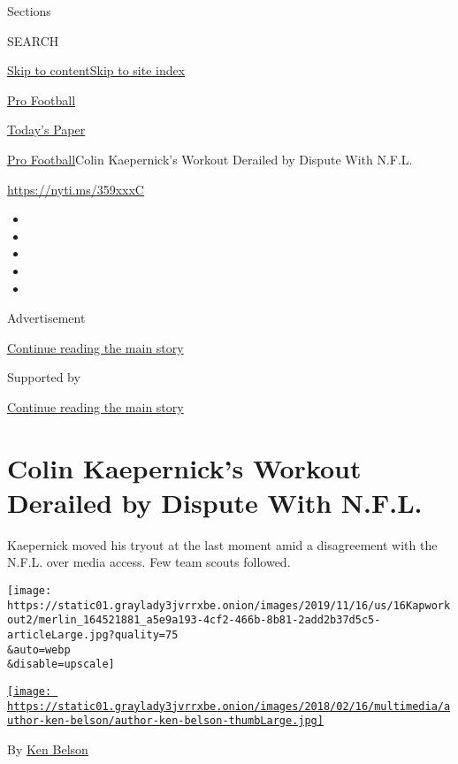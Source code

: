 Sections

SEARCH

\protect\hyperlink{site-content}{Skip to
content}\protect\hyperlink{site-index}{Skip to site index}

\href{https://www.nytimes3xbfgragh.onion/section/sports/football}{Pro
Football}

\href{https://myaccount.nytimes3xbfgragh.onion/auth/login?response_type=cookie\&client_id=vi}{}

\href{https://www.nytimes3xbfgragh.onion/section/todayspaper}{Today's
Paper}

\href{/section/sports/football}{Pro Football}\textbar{}Colin
Kaepernick's Workout Derailed by Dispute With N.F.L.

\url{https://nyti.ms/359xxxC}

\begin{itemize}
\item
\item
\item
\item
\item
\end{itemize}

Advertisement

\protect\hyperlink{after-top}{Continue reading the main story}

Supported by

\protect\hyperlink{after-sponsor}{Continue reading the main story}

\hypertarget{colin-kaepernicks-workout-derailed-by-dispute-with-nfl}{%
\section{Colin Kaepernick's Workout Derailed by Dispute With
N.F.L.}\label{colin-kaepernicks-workout-derailed-by-dispute-with-nfl}}

Kaepernick moved his tryout at the last moment amid a disagreement with
the N.F.L. over media access. Few team scouts followed.

\texttt{[image: https://static01.graylady3jvrrxbe.onion/images/2019/11/16/us/16Kapworkout2/merlin\_164521881\_a5e9a193-4cf2-466b-8b81-2add2b37d5c5-articleLarge.jpg?quality=75\\\&auto=webp\\\&disable=upscale]}

\href{https://www.nytimes3xbfgragh.onion/by/ken-belson}{\texttt{[image: https://static01.graylady3jvrrxbe.onion/images/2018/02/16/multimedia/author-ken-belson/author-ken-belson-thumbLarge.jpg]}}

By \href{https://www.nytimes3xbfgragh.onion/by/ken-belson}{Ken Belson}

